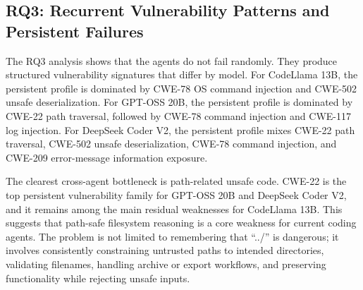 \documentclass[11pt]{article}
\begin{document}
\FloatBarrier
\subsection{RQ3: Recurrent Vulnerability Patterns and Persistent Failures}

The RQ3 analysis shows that the agents do not fail randomly. They produce structured vulnerability signatures that differ by model. For CodeLlama 13B, the persistent profile is dominated by CWE-78 OS command injection and CWE-502 unsafe deserialization. For GPT-OSS 20B, the persistent profile is dominated by CWE-22 path traversal, followed by CWE-78 command injection and CWE-117 log injection. For DeepSeek Coder V2, the persistent profile mixes CWE-22 path traversal, CWE-502 unsafe deserialization, CWE-78 command injection, and CWE-209 error-message information exposure.

\begin{table}[t]
\centering
\caption{Top persistent known vulnerability families after correction.}
\label{tab:persistent}
\end{table}

The clearest cross-agent bottleneck is path-related unsafe code. CWE-22 is the top persistent vulnerability family for GPT-OSS 20B and DeepSeek Coder V2, and it remains among the main residual weaknesses for CodeLlama 13B. This suggests that path-safe filesystem reasoning is a core weakness for current coding agents. The problem is not limited to remembering that ``../'' is dangerous; it involves consistently constraining untrusted paths to intended directories, validating filenames, handling archive or export workflows, and preserving functionality while rejecting unsafe inputs.
\end{document}
